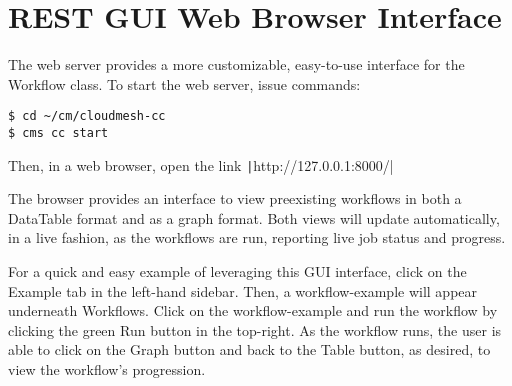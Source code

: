 
\section{REST GUI Web Browser
Interface}\label{rest-gui-web-browser-interface}

The web server provides a more customizable, easy-to-use interface for
the Workflow class. To start the web server, issue commands:

\begin{verbatim}
$ cd ~/cm/cloudmesh-cc
$ cms cc start
\end{verbatim}

Then, in a web browser, open the link \newline
\texttt|http://127.0.0.1:8000/|

The browser provides an interface to view preexisting workflows in both
a DataTable format and as a graph format. Both views will update
automatically, in a live fashion, as the workflows are run, reporting
live job status and progress.

For a quick and easy example of leveraging this GUI interface, click on
the Example tab in the left-hand sidebar. Then, a workflow-example will
appear underneath Workflows. Click on the workflow-example and run the
workflow by clicking the green Run button in the top-right. As the
workflow runs, the user is able to click on the Graph button and back to
the Table button, as desired, to view the workflow's progression.
